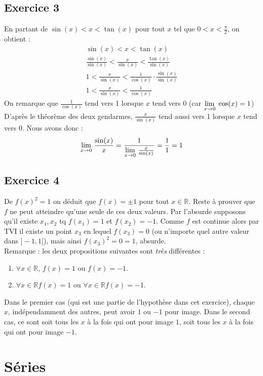 \documentclass{article}
\newcommand{\Lim}[1]{\raisebox{0.0ex}{\scalebox{1}{$\displaystyle \lim_{#1}\;$}}}
\newcommand{\R}{\mathbb{R}}
\begin{document}
\subsection{Exercice 3}
\noindent En partant de $\sin(x) < x < \tan(x)$ pour tout $x$ tel que $0 < x < \frac{\pi}{2}$, on obtient :
\begin{gather*}
    \sin(x) < x < \tan(x)\\
    \frac{\sin(x)}{\sin(x)} < \frac{x}{\sin(x)} < \frac{\tan(x)}{\sin(x)}\\
    1 < \frac{x}{\sin(x)} < \frac{1}{\cos(x)}\cdot\frac{\sin(x)}{\sin(x)}\\
    1 < \frac{x}{\sin(x)} < \frac{1}{\cos(x)}
\end{gather*}
On remarque que $\frac{1}{\cos(x)}$ tend vers 1 lorsque $x$ tend vers 0 (car $\Lim{x \to 0} \cos(x) = 1$)
D'après le théorème des deux gendarmes, $\frac{x}{\sin(x)}$ tend aussi vers 1 lorsque $x$ tend vers 0.
Nous avons donc : 
$$\Lim{x \to 0}\frac{\sin(x)}{x} = \frac{1}{\Lim{x \to 0}\frac{x}{\sin(x)}} = \frac{1}{1} = 1$$
\subsection{Exercice 4}
\noindent De $f(x)^{2}=1$ on déduit que $f(x)=\pm 1$ pour tout $x\in \mathbb{R}$.\newline
Reste à prouver que $f$ ne peut atteindre qu'une seule de ces deux valeurs. Par l'absurde supposons qu'il existe $x_{1},x_{2}$ tq $f(x_{1})=1$ et $f(x_{2})=-1$. Comme $f$ est continue alors par TVI il existe un point $x_3$ en lequel $f(x_3)=0$ (ou n'importe quel autre valeur dans $]-1,1[$), mais ainsi $f(x_3)^2 = 0 = 1$, absurde.\\
Remarque : les deux propositions suivantes sont \textit{très} différentes :
\begin{enumerate}
    \item $\forall x \in \R$, $f(x) = 1$ ou $f(x) = -1$.
    \item $\forall x \in \R f(x) = 1$ ou $\forall x \in \R f(x) = - 1$.
\end{enumerate}
Dans le premier cas (qui est une partie de l'hypothèse dans cet exercice), chaque $x$, indépendamment des autres, peut avoir $1$ ou $-1$ pour image. Dans le second cas, ce sont soit tous les $x$ à la fois qui ont pour image $1$, soit tous les $x$ à la fois qui ont pour image $-1$.
\section{Séries}
\end{document}
